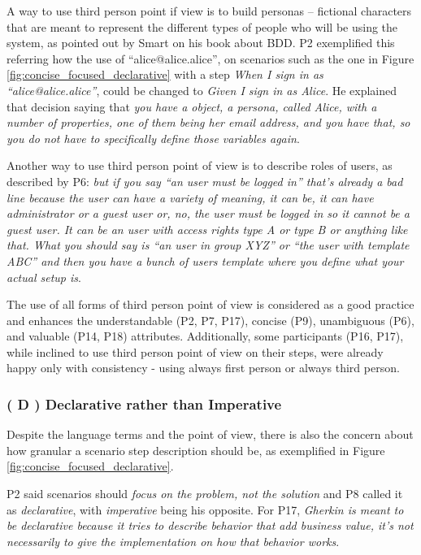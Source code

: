 A way to use third person point if view is to build personas -- fictional characters that are meant to represent the different types of people who will be using the system, as pointed out by Smart \cite{Smart_2014} on his book about BDD. P2 exemplified this referring how the use of ``alice@alice.alice'', on scenarios such as the one in Figure \ref{fig:concise_focused_declarative} with a step \textit{When I sign in as ``alice@alice.alice''}, could be changed to \textit{Given I sign in as Alice}. He explained that decision saying that \textit{you have a object, a persona, called Alice, with a number of properties, one of them being her email address, and you have that, so you do not have to specifically define those variables again}.

Another way to use third person point of view is to describe roles of users, as described by P6: \textit{but if you say ``an user must be logged in'' that's already a bad line because the user can have a variety of meaning, it can be, it can have administrator or a guest user or, no, the user must be logged in so it cannot be a guest user. It can be an user with access rights type A or type B or anything like that. What you should say is ``an user in group XYZ'' or ``the user with template ABC'' and then you have a bunch of users template where you define what your actual setup is}.

The use of all forms of third person point of view is considered as a good practice and enhances the understandable (P2, P7, P17), concise (P9), unambiguous (P6), and valuable (P14, P18) attributes. Additionally, some participants (P16, P17), while inclined to use third person point of view on their steps, were already happy only with consistency - using always first person or always third person.

\subsubsection{\textbf{( D ) Declarative rather than Imperative}}
Despite the language terms and the point of view, there is also the concern about how granular a scenario step description should be, as exemplified in Figure \ref{fig:concise_focused_declarative}.

P2 said scenarios should \textit{focus on the problem, not the solution} and P8 called it as \textit{declarative}, with \textit{imperative} being his opposite. For P17, \textit{Gherkin is meant to be declarative because it tries to describe behavior that add business value, it's not necessarily to give the implementation on how that behavior works}.

